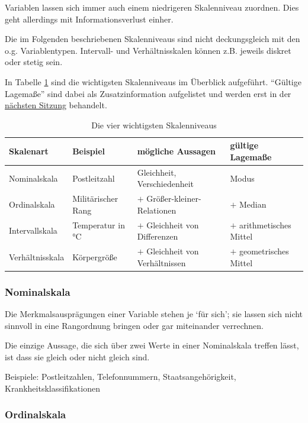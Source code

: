 \documentclass[
  11pt,
  ngerman,
  a4paper,
]{report}
\begin{document}
Variablen lassen sich immer auch einem niedrigeren Skalenniveau zuordnen. Dies geht allerdings mit Informationsverlust einher.

Die im Folgenden beschriebenen Skalenniveaus sind nicht deckungsgleich mit den o.g. Variablentypen. Intervall- und Verhältnisskalen können z.B. jeweils diskret oder stetig sein.

In Tabelle \ref{tab:skalen} sind die wichtigsten Skalenniveaus im Überblick aufgeführt. \enquote{Gültige Lagemaße} sind dabei als Zusatzinformation aufgelistet und werden erst in der \protect\hyperlink{lagemauxdfe}{nächsten Sitzung} behandelt.

\begin{table}

\caption{\label{tab:skalen}Die vier wichtigsten Skalenniveaus}
\centering
\begin{tabular}[t]{llll}
\toprule
Skalenart & Beispiel & mögliche Aussagen & gültige Lagemaße\\
\midrule
Nominalskala & Postleitzahl & Gleichheit, Verschiedenheit & Modus\\
Ordinalskala & Militärischer Rang & $+$ Größer-kleiner-Relationen & $+$ Median\\
Intervallskala & Temperatur in °C & $+$ Gleichheit von Differenzen & $+$ arithmetisches Mittel\\
Verhältnisskala & Körpergröße & $+$ Gleichheit von Verhältnissen & $+$ geometrisches Mittel\\
\bottomrule
\end{tabular}
\end{table}

\hypertarget{nominalskala}{%
\subsubsection{Nominalskala}\label{nominalskala}}

Die Merkmalsausprägungen einer Variable stehen je \enquote*{für sich}; sie lassen sich nicht sinnvoll in eine Rangordnung bringen oder gar miteinander verrechnen.

Die einzige Aussage, die sich über zwei Werte in einer Nominalskala treffen lässt, ist dass sie gleich oder nicht gleich sind.

Beispiele: Postleitzahlen, Telefonnummern, Staatsangehörigkeit, Krankheitsklassifikationen

\hypertarget{ordinalskala}{%
\subsubsection{Ordinalskala}\label{ordinalskala}}
\end{document}
